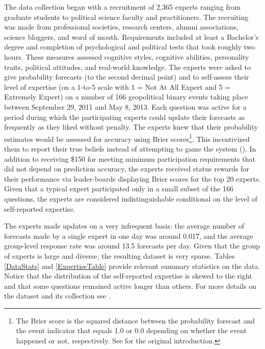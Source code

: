 \documentclass[aoas, preprint]{imsart}
\numberwithin{equation}{section}
\theoremstyle{plain}
\begin{document}
The data collection began with a recruitment of 2,365 experts ranging from graduate students to political science faculty and practitioners. The recruiting was made from professional societies, research centers, alumni associations, science bloggers, and word of mouth. Requirements included at least a Bachelor's degree and completion of psychological and political tests that took roughly two hours. These measures assessed cognitive styles, cognitive abilities, personality traits, political attitudes, and real-world knowledge. The experts were asked to give probability forecasts (to the second decimal point) and to self-assess their level of expertise (on a 1-to-5 scale with 1 = Not At All Expert and 5 = Extremely Expert) on a number of 166 geopolitical binary events taking place between September 29, 2011 and May 8, 2013. Each question was active for a period during which the participating experts could update their forecasts as frequently as they liked without penalty. The experts knew that their probability estimates would be assessed for accuracy using Brier scores\footnote{The Brier score is the squared distance between the probability forecast and the event indicator that equals 1.0 or 0.0 depending on whether the event happened or not, respectively. See \citet{Brier} for the original introduction.}. This incentivized them to report their true beliefs instead of attempting to game the system (\citet{winkler1968good}). In addition to receiving \$150 for meeting minimum participation requirements that did not depend on prediction accuracy, the experts received status rewards for their performance via leader-boards displaying Brier scores for the top 20 experts. Given that a typical expert participated only in a small subset of the 166 questions, the experts are considered indistinguishable conditional on the level of self-reported expertise.


The experts made updates on a very infrequent basis: the average number of forecasts made by a single expert in one day was around 0.017, and the average group-level response rate was around 13.5 forecasts per day. Given that the group of experts is large and diverse, the resulting dataset is very sparse. Tables \ref{DataStats} and \ref{ExpertiseTable} provide relevant summary statistics on the data. Notice that the distribution of the self-reported expertise is skewed to the right and that some questions remained active longer than others.  For more details on the dataset and its collection see \citet{ungar2012good}.
\end{document}
